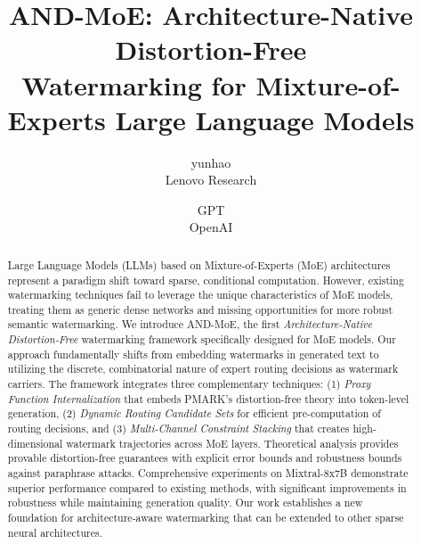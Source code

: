 \documentclass[letterpaper,twocolumn,10pt]{article}
\begin{document}

\date{}

\title{\Large \bf AND-MoE: Architecture-Native Distortion-Free\\ 
  Watermarking for Mixture-of-Experts Large Language Models}

\author{
{\rm yunhao}\\
Lenovo Research
\and
{\rm GPT}\\
OpenAI
}

\maketitle

\begin{abstract}
Large Language Models (LLMs) based on Mixture-of-Experts (MoE) architectures represent a paradigm shift toward sparse, conditional computation. However, existing watermarking techniques fail to leverage the unique characteristics of MoE models, treating them as generic dense networks and missing opportunities for more robust semantic watermarking. We introduce AND-MoE, the first \textit{Architecture-Native Distortion-Free} watermarking framework specifically designed for MoE models. Our approach fundamentally shifts from embedding watermarks in generated text to utilizing the discrete, combinatorial nature of expert routing decisions as watermark carriers. The framework integrates three complementary techniques: (1) \textit{Proxy Function Internalization} that embeds PMARK's distortion-free theory into token-level generation, (2) \textit{Dynamic Routing Candidate Sets} for efficient pre-computation of routing decisions, and (3) \textit{Multi-Channel Constraint Stacking} that creates high-dimensional watermark trajectories across MoE layers. Theoretical analysis provides provable distortion-free guarantees with explicit error bounds and robustness bounds against paraphrase attacks. Comprehensive experiments on Mixtral-8x7B demonstrate superior performance compared to existing methods, with significant improvements in robustness while maintaining generation quality. Our work establishes a new foundation for architecture-aware watermarking that can be extended to other sparse neural architectures.
\end{abstract}
\end{document}
